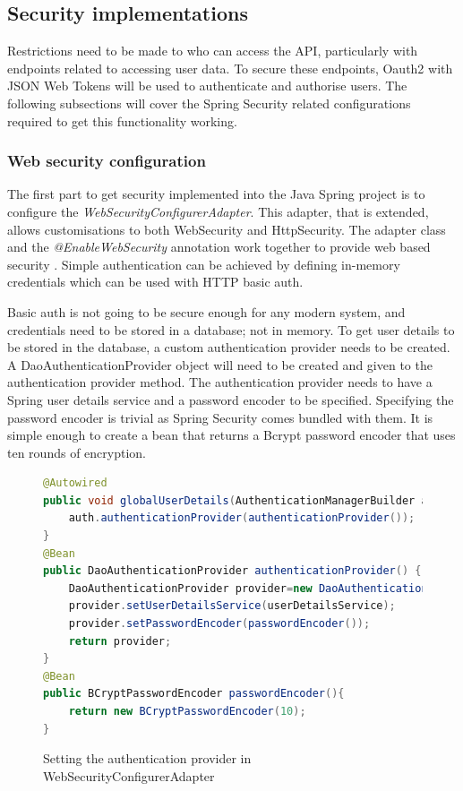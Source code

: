 \clearpage
\subsection{Security implementations}

Restrictions need to be made to who can access the API, particularly with endpoints related to accessing user data.
To secure these endpoints, Oauth2 with JSON Web Tokens will be used to authenticate and authorise users.
The following subsections will cover the Spring Security related configurations required to get this functionality working.




\subsubsection{Web security configuration}
The first part to get security implemented into the Java Spring project is to configure the \textit{WebSecurityConfigurerAdapter}.
This adapter, that is extended, allows customisations to both WebSecurity and HttpSecurity.
The adapter class and the \textit{@EnableWebSecurity} annotation work together to provide web based security \cite{winch2013springsecurity}.
Simple authentication can be achieved by defining in-memory credentials which can be used with HTTP basic auth.

Basic auth is not going to be secure enough for any modern system, and credentials need to be stored in a database; not in memory.
To get user details to be stored in the database, a custom authentication provider needs to be created.
A DaoAuthenticationProvider object will need to be created and given to the authentication provider method.
The authentication provider needs to have a Spring user details service and a password encoder to be specified.
Specifying the password encoder is trivial as Spring Security comes bundled with them. 
It is simple enough to create a bean that returns a Bcrypt password encoder that uses ten rounds of encryption.


\begin{figure}[ht]
    \centering
    \begin{lstlisting}[language=Java]
@Autowired
public void globalUserDetails(AuthenticationManagerBuilder auth) {
    auth.authenticationProvider(authenticationProvider());
}
@Bean
public DaoAuthenticationProvider authenticationProvider() {
    DaoAuthenticationProvider provider=new DaoAuthenticationProvider();
    provider.setUserDetailsService(userDetailsService);
    provider.setPasswordEncoder(passwordEncoder());
    return provider;
}       
@Bean
public BCryptPasswordEncoder passwordEncoder(){
    return new BCryptPasswordEncoder(10);
}
    \end{lstlisting}
    \caption{Setting the authentication provider in WebSecurityConfigurerAdapter}
    \label{settingauthprovider}
\end{figure}

